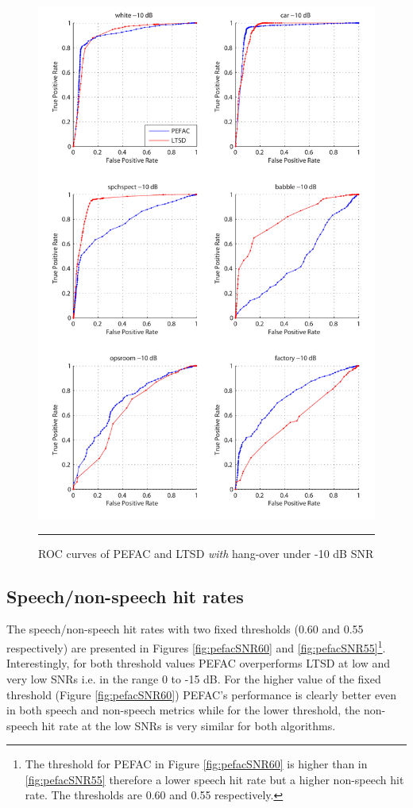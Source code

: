 \begin{figure}[htbp]
	\centering
		\includegraphics[width=1.0\columnwidth]{Figures/Chapter5/pefacm10.pdf}
		\rule{37em}{0.5pt}
	\caption[ROC curves of PEFAC and LTSD \emph{with} hang-over under -10 dB SNR]{ROC curves of PEFAC and LTSD \emph{with} hang-over under -10 dB SNR}
	\label{fig:pefacm10}
\end{figure}

\subsection{Speech/non-speech hit rates}

The speech/non-speech hit rates with two fixed thresholds (0.60 and 0.55 respectively) are presented in Figures \ref{fig:pefacSNR60} and \ref{fig:pefacSNR55}\footnote{The threshold for PEFAC in Figure \ref{fig:pefacSNR60} is higher than in \ref{fig:pefacSNR55} therefore a lower speech hit rate but a higher non-speech hit rate. The thresholds are 0.60 and 0.55 respectively.}. Interestingly, for both threshold values PEFAC overperforms LTSD at low and very low SNRs i.e. in the range 0 to -15 dB. For the higher value of the fixed threshold (Figure \ref{fig:pefacSNR60}) PEFAC's performance is clearly better even in both speech and non-speech metrics while for the lower threshold, the non-speech hit rate at the low SNRs is very similar for both algorithms.

